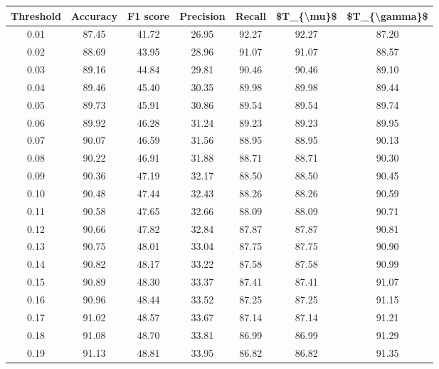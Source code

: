 \begin{tabular}{|c|c|c|c|c|c|c|}
\hline
 Threshold &  Accuracy &  F1 score &  Precision &  Recall &  \$T\_\{\textbackslash mu\}\$ &  \$T\_\{\textbackslash gamma\}\$ \\
\hline
      0.01 &     87.45 &     41.72 &      26.95 &   92.27 &      92.27 &         87.20 \\
      0.02 &     88.69 &     43.95 &      28.96 &   91.07 &      91.07 &         88.57 \\
      0.03 &     89.16 &     44.84 &      29.81 &   90.46 &      90.46 &         89.10 \\
      0.04 &     89.46 &     45.40 &      30.35 &   89.98 &      89.98 &         89.44 \\
      0.05 &     89.73 &     45.91 &      30.86 &   89.54 &      89.54 &         89.74 \\
      0.06 &     89.92 &     46.28 &      31.24 &   89.23 &      89.23 &         89.95 \\
      0.07 &     90.07 &     46.59 &      31.56 &   88.95 &      88.95 &         90.13 \\
      0.08 &     90.22 &     46.91 &      31.88 &   88.71 &      88.71 &         90.30 \\
      0.09 &     90.36 &     47.19 &      32.17 &   88.50 &      88.50 &         90.45 \\
      0.10 &     90.48 &     47.44 &      32.43 &   88.26 &      88.26 &         90.59 \\
      0.11 &     90.58 &     47.65 &      32.66 &   88.09 &      88.09 &         90.71 \\
      0.12 &     90.66 &     47.82 &      32.84 &   87.87 &      87.87 &         90.81 \\
      0.13 &     90.75 &     48.01 &      33.04 &   87.75 &      87.75 &         90.90 \\
      0.14 &     90.82 &     48.17 &      33.22 &   87.58 &      87.58 &         90.99 \\
      0.15 &     90.89 &     48.30 &      33.37 &   87.41 &      87.41 &         91.07 \\
      0.16 &     90.96 &     48.44 &      33.52 &   87.25 &      87.25 &         91.15 \\
      0.17 &     91.02 &     48.57 &      33.67 &   87.14 &      87.14 &         91.21 \\
      0.18 &     91.08 &     48.70 &      33.81 &   86.99 &      86.99 &         91.29 \\
      0.19 &     91.13 &     48.81 &      33.95 &   86.82 &      86.82 &         91.35 \\

\end{tabular}
